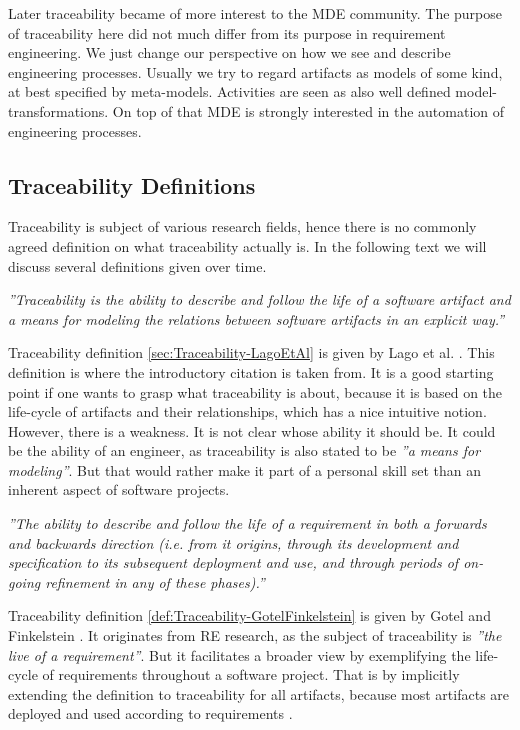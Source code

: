 \documentclass[runningheads,a4paper]{llncs}
\begin{document}
Later traceability became of more interest to the MDE community. 
The purpose of traceability here did not much differ from its purpose in requirement engineering. 
We just change our perspective on how we see and describe engineering processes. 
Usually we try to regard artifacts as models of some kind, at best specified by meta-models.
Activities are seen as also well defined model-transformations. 
On top of that MDE is strongly interested in the automation of engineering processes.


\subsection{Traceability Definitions}
\label{subsec:Traceability-Definitions}
Traceability is subject of various research fields, hence there is no commonly agreed definition on what traceability actually is. 
In the following text we will discuss several definitions given over time.

\begin{definition}
\label{sec:Traceability-LagoEtAl}
\textit{''Traceability is the ability to describe and follow the life of a software artifact and a means for modeling the relations between software artifacts in an explicit way.''} \cite{TraceabilitySurvey}
\end{definition}
Traceability definition \ref{sec:Traceability-LagoEtAl} is given by Lago et al. \cite{ScopedTraceability}.
This definition is where the introductory citation is taken from.
It is a good starting point if one wants to grasp what traceability is about, because it is based on the life-cycle of artifacts and their relationships, which has a nice intuitive notion. 
However, there is a weakness. 
It is not clear whose ability it should be.
It could be the ability of an engineer, as traceability is also stated to be \textit{''a means for modeling''}. 
But that would rather make it part of a personal skill set than an inherent aspect of software projects.


\begin{definition}
\label{def:Traceability-GotelFinkelstein}
\textit{''The ability to describe and follow the life of a requirement in both a forwards and backwards direction (i.e. from it origins, through its development and specification to its subsequent deployment and use, and through periods of on-going refinement in any of these phases).''} \cite{TraceabilitySurvey}
\end{definition}
Traceability definition \ref{def:Traceability-GotelFinkelstein} is given by Gotel and Finkelstein \cite{GotelFinkelstein}.
It originates from RE research, as the subject of traceability is \textit{''the live of a requirement''}.
But it facilitates a broader view by exemplifying the life-cycle of requirements throughout a software project. 
That is by implicitly extending the definition to traceability for all artifacts, because most artifacts are deployed and used according to requirements \cite{TraceabilitySurvey}.
\end{document}
